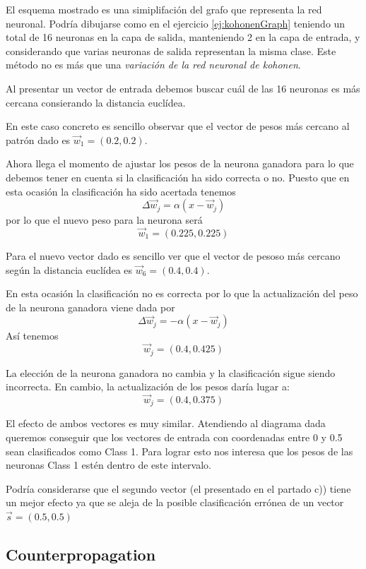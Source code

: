 \begin{problem}[5]
El esquema mostrado es una simiplifación del grafo que representa la red neuronal. Podría dibujarse como en el ejercicio \ref{ej:kohonenGraph} teniendo un total de 16 neuronas en la capa de salida, manteniendo 2 en la capa de entrada, y considerando que varias neuronas de salida representan la misma clase. Este método no es más que una \emph{variación de la red neuronal de kohonen}.

\spart

Al presentar un vector de entrada debemos buscar cuál de las 16 neuronas es más cercana consierando la distancia euclídea.

En este caso concreto es sencillo observar que el vector de pesos más cercano al patrón dado es $\vec{w}_1=(0.2,0.2)$.

Ahora llega el momento de ajustar los pesos de la neurona ganadora para lo que debemos tener en cuenta si la clasificación ha sido correcta o no. Puesto que en esta ocasión la clasificación ha sido acertada tenemos
\[Δ\vec{w}_{j} = α(x-\vec{w}_j)\]
por lo que el nuevo peso para la neurona será
\[\vec{w}_1 = (0.225,0.225)\]

\spart

Para el nuevo vector dado es sencillo ver que el vector de pesoso más cercano según la distancia euclídea es $\vec{w}_6 = (0.4,0.4)$.

En esta ocasión la clasificación no es correcta por lo que la actualización del peso de la neurona ganadora viene dada por
\[Δ\vec{w}_j = -α(x-\vec{w}_j)\]
Así tenemos
\[\vec{w}_j = (0.4, 0.425)\]

\spart

La elección de la neurona ganadora no cambia y la clasificación sigue siendo incorrecta. En cambio, la actualización de los pesos daría lugar a:
\[\vec{w}_j = (0.4, 0.375)\]

\spart

El efecto de ambos vectores es muy similar. Atendiendo al diagrama dada queremos conseguir que los vectores de entrada con coordenadas entre 0 y 0.5 sean clasificados como Class 1. Para lograr esto nos interesa que los pesos de las neuronas Class 1 estén dentro de este intervalo.

Podría considerarse que el segundo vector (el presentado en el partado c)) tiene un mejor efecto ya que se aleja de la posible clasificación errónea de un vector $\vec{s}=(0.5,0.5)$

\end{problem}

\subsection{Counterpropagation}

